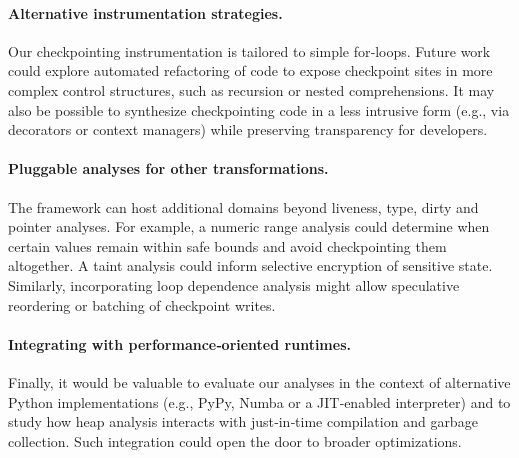\paragraph{Alternative instrumentation strategies.} Our checkpointing instrumentation is tailored to simple for‑loops. Future work could explore automated refactoring of code to expose checkpoint sites in more complex control structures, such as recursion or nested comprehensions. It may also be possible to synthesize checkpointing code in a less intrusive form (e.g., via decorators or context managers) while preserving transparency for developers.

\paragraph{Pluggable analyses for other transformations.} The framework can host additional domains beyond liveness, type, dirty and pointer analyses. For example, a numeric range analysis could determine when certain values remain within safe bounds and avoid checkpointing them altogether. A taint analysis could inform selective encryption of sensitive state. Similarly, incorporating loop dependence analysis might allow speculative reordering or batching of checkpoint writes.

\paragraph{Integrating with performance‑oriented runtimes.} Finally, it would be valuable to evaluate our analyses in the context of alternative Python implementations (e.g., PyPy, Numba or a JIT‑enabled interpreter) and to study how heap analysis interacts with just‑in‑time compilation and garbage collection. Such integration could open the door to broader optimizations.
